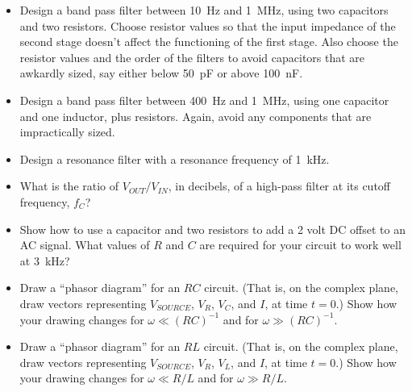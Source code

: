 \begin{itemize}

\item Design a band pass filter between 10~Hz and 1~MHz, using two capacitors and two resistors.  Choose resistor values so that the input impedance of the second stage doesn't affect the functioning of the first stage.  Also choose the resistor values and the order of the filters to avoid capacitors that are awkardly sized, say either below 50~pF or above 100~nF.

\item Design a band pass filter between 400~Hz and 1~MHz, using one capacitor and one inductor, plus resistors.  Again, avoid any components that are impractically sized.

\item Design a resonance filter with a resonance frequency of 1~kHz. 

\item What is the ratio of $V_{OUT}/V_{IN}$, in decibels, of a high-pass filter at its cutoff frequency, $f_C$?

\item Show how to use a capacitor and two resistors to add a 2 volt DC offset to an AC signal.  What values of $R$ and $C$ are required for your circuit to work well at 3~kHz?


\item Draw a ``phasor diagram'' for an $RC$ circuit.  (That is, on the complex plane, draw vectors representing $V_{SOURCE}$, $V_R$, $V_C$, and $I$, at time $t=0$.)  Show how your drawing changes for $\omega \ll (RC)^{-1}$ and for $\omega \gg (RC)^{-1}$.

\item Draw a ``phasor diagram'' for an $RL$ circuit.  (That is, on the complex plane, draw vectors representing $V_{SOURCE}$, $V_R$, $V_L$, and $I$, at time $t=0$.)  Show how your drawing changes for $\omega \ll R/L$ 
and for $\omega \gg R/L$.

\end{itemize}





